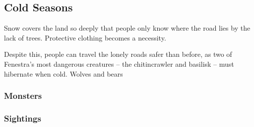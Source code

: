 \bigLine
\begin{multicols}{2}

\subsection{Cold Seasons}

Snow covers the land so deeply that people only know where the road lies by the lack of trees.
Protective clothing becomes a necessity.

Despite this, people can travel the lonely roads safer than before, as two of Fenestra's most dangerous creatures -- the chitincrawler and basilisk -- must hibernate when cold.
Wolves and bears 

\encColdVillages

\encColdEdge

\encColdForest

\subsubsection*{Monsters}

\begin{multicols}{2}
\setcounter{enc}{1}
\begin{dlist}
\end{dlist}

\subsubsection*{Sightings}

\setcounter{track}{2}
\begin{dlist}
\end{dlist}

\end{multicols}

\end{multicols}

\bigLine

